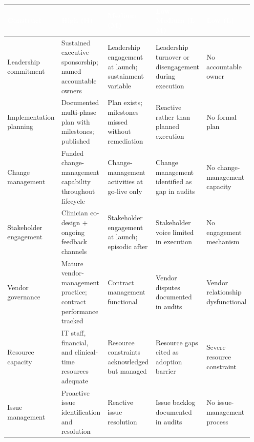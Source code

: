 \begin{table}[H]
\footnotesize
\begin{tabular}{p{2.5cm} p{3.1cm} p{3.1cm} p{3.1cm} p{3.1cm}}
\toprule
\rowcolor{headerblue}
\textcolor{white}{\textbf{Construct}} &
\textcolor{white}{\textbf{High (H)}} &
\textcolor{white}{\textbf{Medium (M)}} &
\textcolor{white}{\textbf{Low--Medium (L--M)}} &
\textcolor{white}{\textbf{Low (L)}} \\
\midrule

\rowcolor{rowgray}
Leadership commitment &
Sustained executive sponsorship; named accountable owners &
Leadership engagement at launch; sustainment variable &
Leadership turnover or disengagement during execution &
No accountable owner \\

Implementation planning &
Documented multi-phase plan with milestones; published &
Plan exists; milestones missed without remediation &
Reactive rather than planned execution &
No formal plan \\

\rowcolor{rowgray}
Change management &
Funded change-management capability throughout lifecycle &
Change-management activities at go-live only &
Change management identified as gap in audits &
No change-management capacity \\

Stakeholder engagement &
Clinician co-design + ongoing feedback channels &
Stakeholder engagement at launch; episodic after &
Stakeholder voice limited in execution &
No engagement mechanism \\

\rowcolor{rowgray}
Vendor governance &
Mature vendor-management practice; contract performance tracked &
Contract management functional &
Vendor disputes documented in audits &
Vendor relationship dysfunctional \\

Resource capacity &
IT staff, financial, and clinical-time resources adequate &
Resource constraints acknowledged but managed &
Resource gaps cited as adoption barrier &
Severe resource constraint \\

\rowcolor{rowgray}
Issue management &
Proactive issue identification and resolution &
Reactive issue resolution &
Issue backlog documented in audits &
No issue-management process \\

\bottomrule
\end{tabular}
\end{table}

